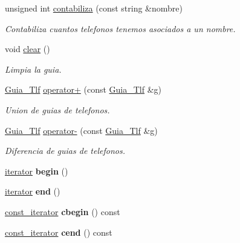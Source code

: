 \begin{DoxyCompactItemize}
unsigned int \hyperlink{classGuia__Tlf_aa63213524c6339ea89baae2b5d2ebb69}{contabiliza} (const string \&nombre)
\begin{DoxyCompactList}\small\item\em Contabiliza cuantos telefonos tenemos asociados a un nombre. \end{DoxyCompactList}\item 
\mbox{\label{classGuia__Tlf_a36ac970ece51a62763bb3898159d0047}} 
void \hyperlink{classGuia__Tlf_a36ac970ece51a62763bb3898159d0047}{clear} ()
\begin{DoxyCompactList}\small\item\em Limpia la guia. \end{DoxyCompactList}\item 
\hyperlink{classGuia__Tlf}{Guia\+\_\+\+Tlf} \hyperlink{classGuia__Tlf_a3e0b08a1985d3c72853690730319172f}{operator+} (const \hyperlink{classGuia__Tlf}{Guia\+\_\+\+Tlf} \&g)
\begin{DoxyCompactList}\small\item\em Union de guias de telefonos. \end{DoxyCompactList}\item 
\hyperlink{classGuia__Tlf}{Guia\+\_\+\+Tlf} \hyperlink{classGuia__Tlf_ac381d53f275ce769830e07fbc56902b0}{operator-\/} (const \hyperlink{classGuia__Tlf}{Guia\+\_\+\+Tlf} \&g)
\begin{DoxyCompactList}\small\item\em Diferencia de guias de telefonos. \end{DoxyCompactList}\item 
\mbox{\label{classGuia__Tlf_a2a325e84f226b0c9776115da309493ba}} 
\hyperlink{classGuia__Tlf_1_1iterator}{iterator} {\bfseries begin} ()
\item 
\mbox{\label{classGuia__Tlf_a8634ac1042bfe924e59db3ed44152a70}} 
\hyperlink{classGuia__Tlf_1_1iterator}{iterator} {\bfseries end} ()
\item 
\mbox{\label{classGuia__Tlf_a9415a504894532f25ffe8e74167f6692}} 
\hyperlink{classGuia__Tlf_1_1const__iterator}{const\+\_\+iterator} {\bfseries cbegin} () const
\item 
\mbox{\label{classGuia__Tlf_ac2b7430eafae48fb68569c23b54d47ec}} 
\hyperlink{classGuia__Tlf_1_1const__iterator}{const\+\_\+iterator} {\bfseries cend} () const

\end{DoxyCompactItemize}
